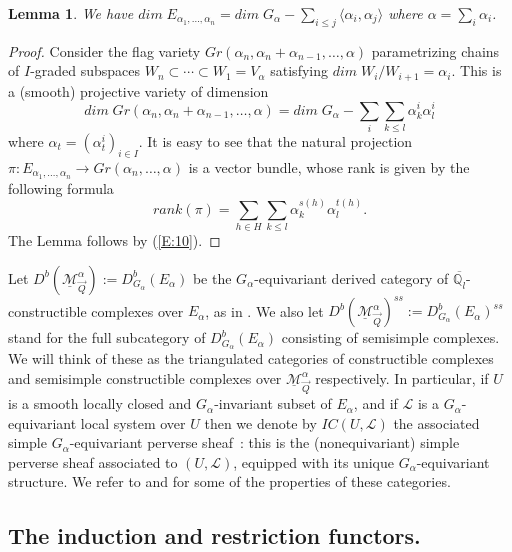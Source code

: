 \documentclass[a4paper,10pt]{amsart}
\def\a{\alpha}
\def\qlb{\overline{\mathbb{Q}_l}}
\def\Ma{\underline{\mathcal{M}}^{\alpha}_{\vec{Q}}}
\newtheorem{lem}[theo]{Lemma}
\numberwithin{equation}{section}
\begin{document}
\vspace{.1in}

\begin{lem} We have $dim\;E_{\a_1, \ldots, \a_n}=dim\;G_{\a}-\sum_{i \leq j} \langle \a_i,\a_j\rangle$ where $\a=\sum_i \a_i$.
\end{lem}
\begin{proof}
Consider the flag variety $Gr(\a_n, \a_n+\a_{n-1}, \ldots, \a)$ parametrizing chains of $I$-graded subspaces 
$W_n \subset \cdots \subset W_1=V_{\a}$ satisfying $dim\;W_{i}/W_{i+1}=\a_i$. This is a (smooth) projective variety of dimension 
$$ dim\; Gr(\a_n, \a_n+\a_{n-1}, \ldots, \a)=dim\;G_{\a}-\sum_i \sum_{k \leq l} \a_k^i\a_l^i$$
where $\a_t=(\a_t^i)_{i \in I}$.  It is easy to see that the natural projection $\pi: E_{\a_1, \ldots, \a_n} \to Gr(\a_n, \ldots, \a)$ is a vector bundle, whose rank is given by the following formula
$$rank(\pi)=\sum_{h\in H} \sum_{k \leq l} \a_k^{s(h)}\a_l^{t(h)}.$$
The Lemma follows by (\ref{E:10}).
\end{proof}

\vspace{.1in}

 Let $D^b(\Ma):=D^b_{G_{\alpha}}(E_{\alpha})$ be the $G_{\a}$-equivariant derived category of $\qlb$-constructible complexes over $E_{\a}$, as in \cite{Bernstein-Lunts}. We also let $D^b(\Ma)^{ss}:=D^b_{G_{\alpha}}(E_{\alpha})^{ss}$ stand for the full subcategory of $D^b_{G_{\alpha}}(E_{\alpha})$ consisting of semisimple complexes. We will think of these as the triangulated categories of constructible complexes and semisimple constructible complexes over $\Ma$ respectively. In particular, if $U$ is a smooth locally closed and $G_{\a}$-invariant subset of $E_{\a}$, and if $\mathcal{L}$ is a $G_{\a}$-equivariant local system over $U$ then we denote by $IC(U,\mathcal{L})$ the associated simple $G_\a$-equivariant perverse sheaf~: this is the (nonequivariant) simple perverse sheaf associated to $(U,\mathcal{L})$, equipped with its unique $G_{\a}$-equivariant structure. We refer to \cite{FK} and \cite{Bernstein-Lunts} for some of the properties of these categories. 

\vspace{.3in}

\subsection{The induction and restriction functors.}
\end{document}
